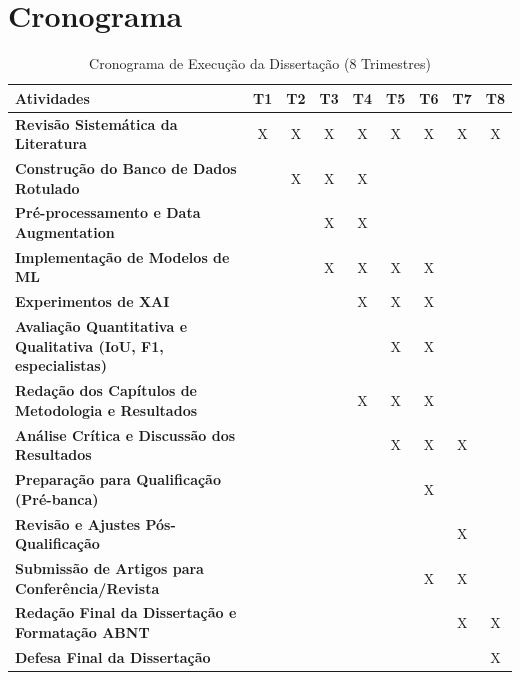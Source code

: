 \chapter{Cronograma}

\begin{table}[htb]
    \centering
    \caption{Cronograma de Execução da Dissertação (8 Trimestres)}
    \label{tab:cronograma}
    \begin{tabular}{p{5.5cm} *{8}{c}}
        \toprule
        \textbf{Atividades} & \textbf{T1} & \textbf{T2} & \textbf{T3} & \textbf{T4} & \textbf{T5} & \textbf{T6} & \textbf{T7} & \textbf{T8} \\
        \midrule
        \textbf{Revisão Sistemática da Literatura} & X & X & X & X & X & X & X & X \\
        \addlinespace
        \textbf{Construção do Banco de Dados Rotulado} &  & X & X & X &  &  &  &  \\
        \addlinespace
        \textbf{Pré-processamento e Data Augmentation} &  &  & X & X &  &  &  &  \\
        \addlinespace
        \textbf{Implementação de Modelos de ML} &  &  & X & X & X & X &  &  \\
        \addlinespace
        \textbf{Experimentos de XAI} &  &  &  & X & X & X &  &  \\
        \addlinespace
        \textbf{Avaliação Quantitativa e Qualitativa (IoU, F1, especialistas)} &  &  &  &  & X & X &  &  \\
        \addlinespace
        \midrule
        \textbf{Redação dos Capítulos de Metodologia e Resultados} &  &  &  & X & X & X &  &  \\
        \addlinespace
        \textbf{Análise Crítica e Discussão dos Resultados} &  &  &  &  & X & X & X &  \\
        \addlinespace
        \textbf{Preparação para Qualificação (Pré-banca)} &  &  &  &  &  & X &  &  \\
        \addlinespace
        \textbf{Revisão e Ajustes Pós-Qualificação} &  &  &  &  &  &  & X &  \\
        \addlinespace
        \textbf{Submissão de Artigos para Conferência/Revista} &  &  &  &  &  & X & X &  \\
        \addlinespace
        \textbf{Redação Final da Dissertação e Formatação ABNT} &  &  &  &  &  &  & X & X \\
        \addlinespace
        \textbf{Defesa Final da Dissertação} &  &  &  &  &  &  &  & X \\
        \bottomrule
    \end{tabular}
\end{table}
